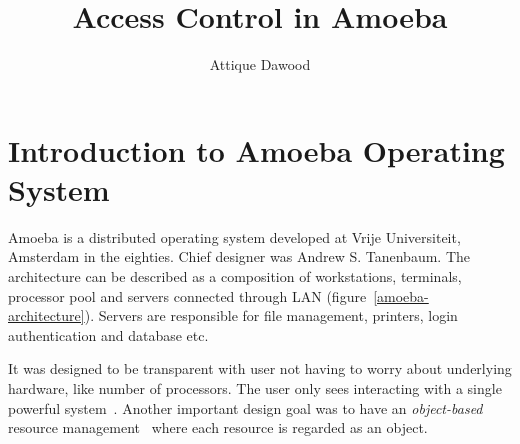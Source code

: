 \documentclass[11pt,a4paper]{article}
\begin{document}
\title{Access Control in Amoeba}
\author{Attique Dawood}
\maketitle

\section{Introduction to Amoeba Operating System}

Amoeba is a distributed operating system developed at Vrije Universiteit, Amsterdam in the eighties. Chief designer was Andrew S. Tanenbaum. The architecture can be described as a composition of workstations, terminals, processor pool and servers connected through LAN (figure~\ref{amoeba-architecture}). Servers are responsible for file management, printers, login authentication and database etc.

It was designed to be transparent with user not having to worry about underlying hardware, like number of processors. The user only sees interacting with a single powerful system~\cite{amoeba-sourceforge}. Another important design goal was to have an \emph{object-based} resource management~\cite{distributed-systems-coulouris} where each resource is regarded as an object.
\end{document}

